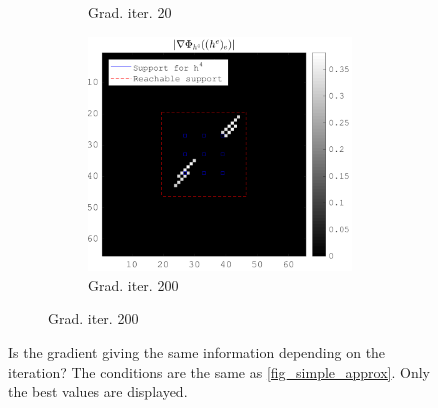 \begin{figure}[!h]
\begin{subfigure}[b]{0.49\textwidth}
\begin{subfigure}[b]{0.49\textwidth}
	\caption{Grad. iter. 20}
	\end{subfigure}
	\begin{subfigure}[b]{0.49\textwidth}\centering
	\includegraphics[width=\textwidth]{figures/xp_grad_iterations/xp_128x128_sc2_angl1_K3_S3_node4_partgrad4_bestvalues.png}
	\caption{Grad. iter. 200}
	\end{subfigure}
\end{subfigure}
\caption{Is the gradient giving the same information depending on the iteration? The conditions are the same as \cref{fig_simple_approx}. Only the best values are displayed.}
\end{figure}

